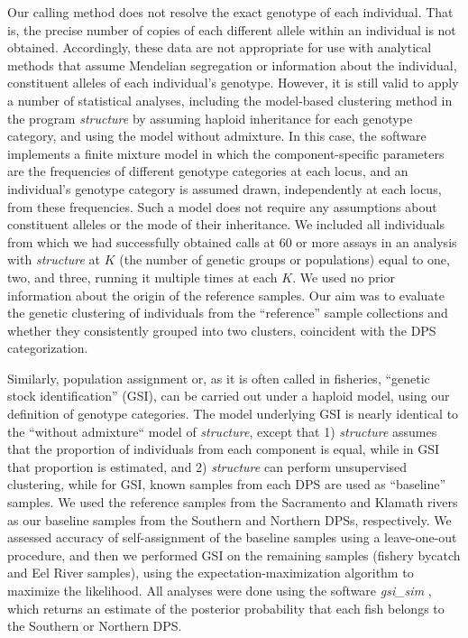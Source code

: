 Our calling method does not resolve the exact genotype of each individual. That is, the
precise number of copies of each different allele within an individual is not
obtained. Accordingly, these data are not appropriate for use with analytical
methods that assume Mendelian segregation or information about the individual, 
constituent alleles of each
individual's genotype. However, it is still valid to apply 
a number of statistical analyses, including the model-based clustering method
in the program {\em structure} by assuming haploid inheritance for each genotype category,
and using the model without admixture. 
In this case, the software implements a finite mixture model in which 
the component-specific parameters are the frequencies of different genotype categories
at each locus, and an individual's genotype category is assumed drawn, independently 
at each locus, from these frequencies.  
Such a model does not require any assumptions about
constituent alleles or the mode of their inheritance.
We included all individuals from which we had successfully
obtained calls at 60 or more assays in an analysis with {\em structure} at $K$ (the number
of genetic groups or populations) equal to one, two, and three, running it
multiple times at each $K$. We used no prior information about the origin
of the reference samples. Our aim was to evaluate the genetic clustering of
individuals from the ``reference'' sample collections and whether they
consistently grouped into two clusters, coincident with the DPS categorization.

Similarly, population assignment or, as it is often called in
fisheries, ``genetic stock identification'' (GSI), can be carried out under a
haploid model, using our definition of genotype categories. The model underlying
GSI is nearly identical to the ``without admixture`` model of {\em structure}, except that 1)
{\em structure} assumes that the proportion of individuals from each component is
equal, while in GSI that proportion is estimated, and 2) {\em structure}
can perform unsupervised clustering, while for GSI, known samples from each
DPS are used as ``baseline'' samples. We used the reference samples from the Sacramento and
Klamath rivers as our baseline samples from the Southern and Northern DPSs,
respectively. We assessed accuracy of self-assignment of the
baseline samples using a leave-one-out procedure, and then we performed GSI on
the remaining samples (fishery bycatch and Eel River samples), using the
expectation-maximization algorithm \citep{Dempsteretal1977} to maximize the likelihood. All analyses
were done using the software {\em gsi\_sim} \citep{Andersonetal2008,Israeletal2009}, 
which returns an estimate of the posterior probability that each fish
belongs to the Southern or Northern DPS.

